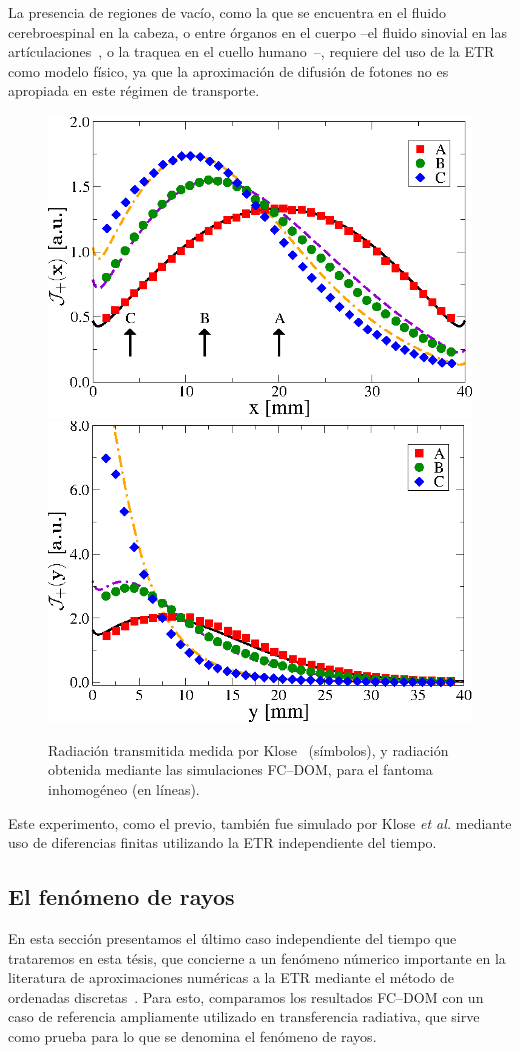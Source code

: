 La presencia de regiones de vacío, como la que se encuentra en el 
fluido cerebroespinal en la cabeza, o entre órganos en el cuerpo 
--el fluido sinovial en las artículaciones~\cite{Netz2001}, 
o la traquea en el cuello humano~\cite{Fujii2016}--, 
requiere del uso de la ETR como modelo físico, ya que la 
aproximación de difusión de fotones no es apropiada en este régimen de transporte. 
\begin{figure}[h!]
\centering
  \includegraphics[width=0.48\linewidth]{figuras/kloseph2x.eps}
  \includegraphics[width=0.48\linewidth]{figuras/ph2y.eps}
  \caption{Radiación transmitida medida por Klose~\cite{Klose2002} (símbolos),
  y radiación obtenida mediante las simulaciones FC--DOM, para 
  el fantoma inhomogéneo (en líneas).}
 \label{fig:fluxph2}
\end{figure}
Este experimento, como el previo, también fue simulado por Klose {\it et al.} 
\cite{Klose2002} mediante uso de diferencias finitas utilizando la ETR 
independiente del tiempo.

\subsection{El fenómeno de rayos}
\label{subsec:rayeff}
En esta sección presentamos el último caso independiente del tiempo 
que trataremos en esta tésis, que concierne a un 
fenómeno númerico importante en la literatura 
de aproximaciones numéricas a la ETR mediante el método 
de ordenadas discretas~\cite{Lewis1984}. 
Para esto, comparamos los resultados FC--DOM con un caso 
de referencia ampliamente utilizado en transferencia radiativa, 
que sirve como prueba para lo que se denomina el fenómeno 
de rayos.

